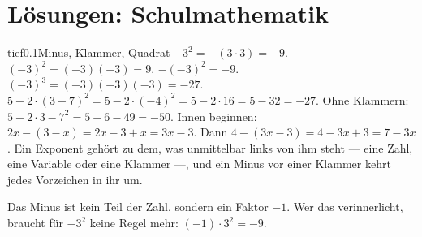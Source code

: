 \chapter{Lösungen: Schulmathematik}

\begin{loesungkarte}{tief}{0.1}{Minus, Klammer, Quadrat}
$-3^{2} = -(3\cdot3) = -9$. \quad $(-3)^{2} = (-3)(-3) = 9$. \quad $-(-3)^{2} = -9$. \quad $(-3)^{3} = (-3)(-3)(-3) = -27$.
$5 - 2\cdot(3 - 7)^{2} = 5 - 2\cdot(-4)^{2} = 5 - 2\cdot16 = 5 - 32 = -27$. Ohne Klammern: $5 - 2\cdot3 - 7^{2} = 5 - 6 - 49 = -50$.
Innen beginnen: $2x - (3 - x) = 2x - 3 + x = 3x - 3$. Dann $4 - (3x - 3) = 4 - 3x + 3 = 7 - 3x$.
Ein Exponent gehört zu dem, was unmittelbar links von ihm steht --- eine Zahl, eine Variable oder eine Klammer ---, und ein Minus vor einer Klammer kehrt jedes Vorzeichen in ihr um.
\begin{mitnehmen}\kastentext
Das Minus ist kein Teil der Zahl, sondern ein Faktor $-1$. Wer das verinnerlicht, braucht für $-3^{2}$ keine Regel mehr: $(-1)\cdot3^{2} = -9$.
\end{mitnehmen}
\end{loesungkarte}

